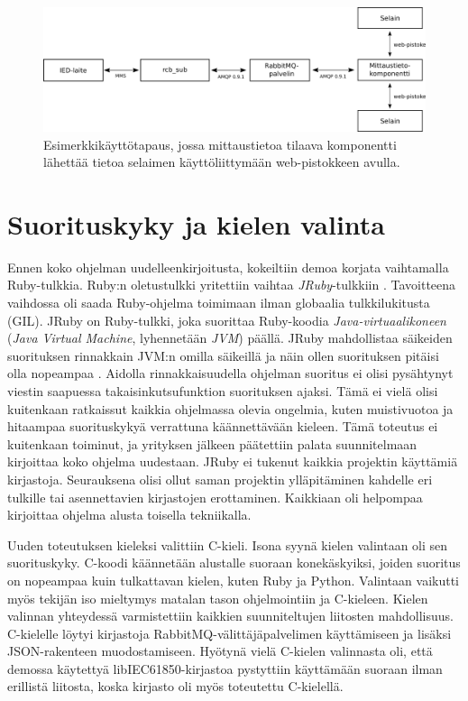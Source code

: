 \begin{figure}[ht!]
	\includegraphics[width=1\textwidth]{pictures/example-use-case.png}
	\caption{Esimerkkikäyttötapaus, jossa mittaustietoa tilaava komponentti lähettää tietoa selaimen käyttöliittymään web-pistokkeen avulla.}
	\label{fig:example-use-case}
\end{figure}


\section{Suorituskyky ja kielen valinta}
Ennen koko ohjelman uudelleenkirjoitusta, kokeiltiin demoa korjata vaihtamalla Ruby-tulkkia. Ruby:n oletustulkki yritettiin vaihtaa \emph{JRuby}-tulkkiin \cite{jruby-homepage}. Tavoitteena vaihdossa oli saada Ruby-ohjelma toimimaan ilman globaalia tulkkilukitusta (GIL). JRuby on Ruby-tulkki, joka suorittaa Ruby-koodia \emph{Java-virtuaalikoneen} (\emph{Java Virtual Machine}, lyhennetään \emph{JVM}) päällä. JRuby mahdollistaa säikeiden suorituksen rinnakkain JVM:n omilla säikeillä ja näin ollen suorituksen pitäisi olla nopeampaa \mbox{\cite{Youssef2013}}. Aidolla rinnakkaisuudella ohjelman suoritus ei olisi pysähtynyt viestin saapuessa takaisinkutsufunktion suorituksen ajaksi. Tämä ei vielä olisi kuitenkaan ratkaissut kaikkia ohjelmassa olevia ongelmia, kuten muistivuotoa ja hitaampaa suorituskykyä verrattuna käännettävään kieleen. Tämä toteutus ei kuitenkaan toiminut, ja yrityksen jälkeen päätettiin palata suunnitelmaan kirjoittaa koko ohjelma uudestaan. JRuby ei tukenut kaikkia projektin käyttämiä kirjastoja. Seurauksena olisi ollut saman projektin ylläpitäminen kahdelle eri tulkille tai asennettavien kirjastojen erottaminen. Kaikkiaan oli helpompaa kirjoittaa ohjelma alusta toisella tekniikalla.

Uuden toteutuksen kieleksi valittiin C-kieli. Isona syynä kielen valintaan oli sen suorituskyky. C-koodi käännetään alustalle suoraan konekäskyiksi, joiden suoritus on nopeampaa kuin tulkattavan kielen, kuten Ruby ja Python. Valintaan vaikutti myös tekijän iso mieltymys matalan tason ohjelmointiin ja C-kieleen. Kielen valinnan yhteydessä varmistettiin kaikkien suunniteltujen liitosten mahdollisuus. C-kielelle löytyi kirjastoja RabbitMQ-välittäjäpalvelimen käyttämiseen ja lisäksi JSON-rakenteen muodostamiseen. Hyötynä vielä C-kielen valinnasta oli, että demossa käytettyä libIEC61850-kirjastoa pystyttiin käyttämään suoraan ilman erillistä liitosta, koska kirjasto oli myös toteutettu C-kielellä.


